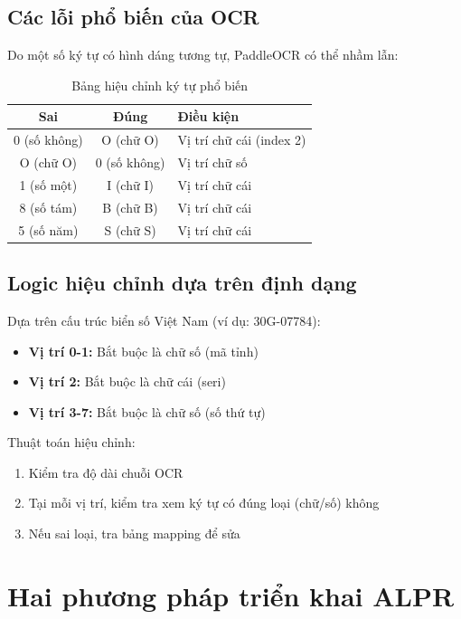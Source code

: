 \subsection{Các lỗi phổ biến của OCR}
Do một số ký tự có hình dáng tương tự, PaddleOCR có thể nhầm lẫn:

\begin{table}[!ht]
\centering
\caption{Bảng hiệu chỉnh ký tự phổ biến}
\label{tab:char_correction}
\begin{tabular}{|c|c|l|}
\hline
\textbf{Sai} & \textbf{Đúng} & \textbf{Điều kiện} \\ \hline
0 (số không) & O (chữ O) & Vị trí chữ cái (index 2) \\ \hline
O (chữ O) & 0 (số không) & Vị trí chữ số \\ \hline
1 (số một) & I (chữ I) & Vị trí chữ cái \\ \hline
8 (số tám) & B (chữ B) & Vị trí chữ cái \\ \hline
5 (số năm) & S (chữ S) & Vị trí chữ cái \\ \hline
\end{tabular}
\end{table}

\subsection{Logic hiệu chỉnh dựa trên định dạng}
Dựa trên cấu trúc biển số Việt Nam (ví dụ: 30G-07784):
\begin{itemize}
    \item \textbf{Vị trí 0-1:} Bắt buộc là chữ số (mã tỉnh)
    \item \textbf{Vị trí 2:} Bắt buộc là chữ cái (seri)
    \item \textbf{Vị trí 3-7:} Bắt buộc là chữ số (số thứ tự)
\end{itemize}

Thuật toán hiệu chỉnh:
\begin{enumerate}
    \item Kiểm tra độ dài chuỗi OCR
    \item Tại mỗi vị trí, kiểm tra xem ký tự có đúng loại (chữ/số) không
    \item Nếu sai loại, tra bảng mapping để sửa
\end{enumerate}

\section{Hai phương pháp triển khai ALPR}

